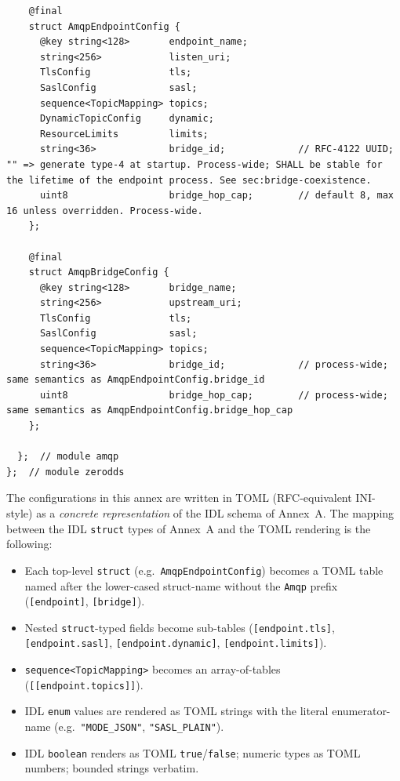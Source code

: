 \documentclass{../styles/zerodds-vendor-spec}
\begin{document}
\begin{lstlisting}
    @final
    struct AmqpEndpointConfig {
      @key string<128>       endpoint_name;
      string<256>            listen_uri;
      TlsConfig              tls;
      SaslConfig             sasl;
      sequence<TopicMapping> topics;
      DynamicTopicConfig     dynamic;
      ResourceLimits         limits;
      string<36>             bridge_id;             // RFC-4122 UUID; "" => generate type-4 at startup. Process-wide; SHALL be stable for the lifetime of the endpoint process. See sec:bridge-coexistence.
      uint8                  bridge_hop_cap;        // default 8, max 16 unless overridden. Process-wide.
    };

    @final
    struct AmqpBridgeConfig {
      @key string<128>       bridge_name;
      string<256>            upstream_uri;
      TlsConfig              tls;
      SaslConfig             sasl;
      sequence<TopicMapping> topics;
      string<36>             bridge_id;             // process-wide; same semantics as AmqpEndpointConfig.bridge_id
      uint8                  bridge_hop_cap;        // process-wide; same semantics as AmqpEndpointConfig.bridge_hop_cap
    };

  };  // module amqp
};  // module zerodds
\end{lstlisting}


The configurations in this annex are written in TOML
(RFC-equivalent INI-style) as a \emph{concrete representation}
of the IDL schema of Annex~A. The mapping between the IDL
\texttt{struct} types of Annex~A and the TOML rendering is the
following:

\begin{itemize}
  \item Each top-level \texttt{struct} (e.g.\ \texttt{AmqpEndpointConfig})
        becomes a TOML table named after the lower-cased
        struct-name without the \texttt{Amqp} prefix
        (\texttt{[endpoint]}, \texttt{[bridge]}).
  \item Nested \texttt{struct}-typed fields become sub-tables
        (\texttt{[endpoint.tls]}, \texttt{[endpoint.sasl]},
        \texttt{[endpoint.dynamic]}, \texttt{[endpoint.limits]}).
  \item \texttt{sequence<TopicMapping>} becomes an array-of-tables
        (\texttt{[[endpoint.topics]]}).
  \item IDL \texttt{enum} values are rendered as TOML strings
        with the literal enumerator-name
        (e.g.\ \texttt{"MODE\_JSON"}, \texttt{"SASL\_PLAIN"}).
  \item IDL \texttt{boolean} renders as TOML \texttt{true}/\texttt{false};
        numeric types as TOML numbers; bounded strings verbatim.
\end{itemize}
\end{document}
